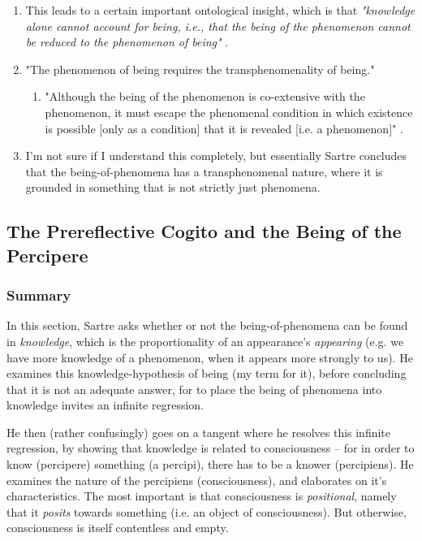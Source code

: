 \begin{enumerate}
\begin{enumerate}
  \end{enumerate}
  \item This leads to a certain important ontological insight, which is that \emph{"knowledge alone cannot account for being, i.e., that the being of the phenomenon cannot be reduced to the phenomenon of being"} \autocite[7]{sartre}.
  \item "The phenomenon of being requires the transphenomenality of being." \autocite[7]{sartre}
  \begin{enumerate}
    \item "Although the being of the phenomenon is co-extensive with the phenomenon, it must escape the phenomenal condition in which existence is possible [only as a condition] that it is revealed [i.e. a phenomenon]" \autocite[7]{sartre}.
  \end{enumerate}
  \item I'm not sure if I understand this completely, but essentially Sartre concludes that the being-of-phenomena has a transphenomenal nature, where it is grounded in something that is not strictly just phenomena.
\end{enumerate}

\subsection{The Prereflective Cogito and the Being of the Percipere}

\subsubsection*{Summary}
In this section, Sartre asks whether or not the being-of-phenomena can be found in \emph{knowledge}, which is the proportionality of an appearance's \emph{appearing} (e.g. we have more knowledge of a phenomenon, when it appears more strongly to us). He examines this knowledge-hypothesis of being (my term for it), before concluding that it is not an adequate answer, for to place the being of phenomena into knowledge invites an infinite regression.

He then (rather confusingly) goes on a tangent where he resolves this infinite regression, by showing that knowledge is related to consciousness -- for in order to know (percipere) something (a percipi), there has to be a knower (percipiens). He examines the nature of the percipiens (consciousness), and elaborates on it's characteristics. The most important is that consciousness is \emph{positional}, namely that it \emph{posits} towards something (i.e. an object of consciousness). But otherwise, consciousness is itself contentless and empty.

